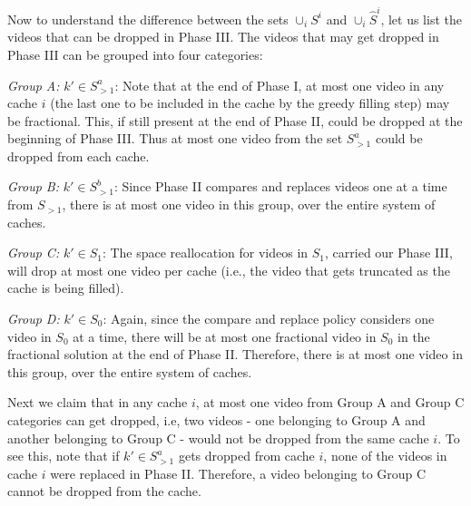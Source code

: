 \documentclass[conference]{IEEEtran}
\begin{document}
Now to understand the difference between the sets $\cup_i S^i$ and $\cup_i \hat{S}^i$, let us list the videos that can be dropped in Phase III. The videos that may get dropped in Phase III can be grouped into four categories:

\noindent \textit{Group A:} \underline{$k' \in S^a_{>1}$}: Note that at the end of Phase I, at most one video in any cache $i$ (the last one to be included in the cache by the greedy filling step) may be fractional. This, if still present at the end of Phase II, could be dropped at the beginning of Phase III. Thus at most one video from the set $S^a_{>1}$ could be dropped from each cache. 

\noindent \textit{Group B:} \underline{$k' \in S^b_{>1}$}: Since Phase II compares and replaces videos one at a time from $S_{>1}$, there is at most one video in this group, over the entire system of caches.

\noindent \textit{Group C:} \underline{$k' \in S_1$}: The space reallocation for videos in $S_1$, carried our Phase III, will drop at most one video per cache (i.e., the video that gets truncated as the cache is being filled).

\noindent \textit{Group D:} \underline{$k' \in S_0$}: Again, since the compare and replace policy considers one video in $S_0$ at a time, there will be at most one fractional video in $S_0$ in the fractional solution at the end of Phase II. Therefore, there is at most one video in this group, over the entire system of caches.

Next we claim that in any cache $i$, at most one video from Group A and Group C categories can get dropped, i.e, two videos - one belonging to Group A and another belonging to Group C - would not be dropped from the same cache $i$. To see this, note that if $k' \in S^a_{>1}$ gets dropped from cache $i$, none of the videos in cache $i$ were replaced in Phase II. Therefore, a video belonging to Group C cannot be dropped from the cache.
\end{document}
